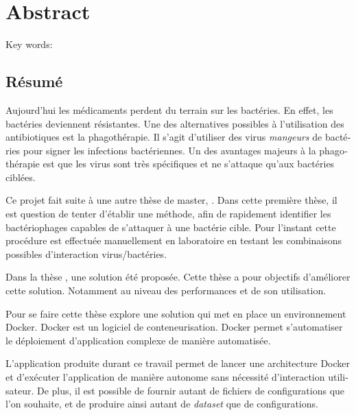 

\cleardoublepage
\chapter*{Abstract}
\lipsum[1-2]
\vskip0.5cm
Key words: 


\begin{otherlanguage}{french}
\cleardoublepage
\chapter*{Résumé}

Aujourd'hui les médicaments perdent du terrain sur les bactéries. En effet, les bactéries deviennent résistantes. Une des alternatives possibles à l'utilisation des antibiotiques est la phagothérapie. Il s'agit d'utiliser des virus \emph{mangeurs} de bactéries pour signer les infections bactériennes. Un des avantages majeurs à la phagothérapie est que les virus sont très spécifiques et ne s'attaque qu'aux bactéries ciblées. 

Ce projet fait suite à une autre thèse de master, \thLeite . Dans cette première thèse, il est question de tenter d'établir une méthode, afin de rapidement identifier les bactériophages capables de s'attaquer à une bactérie cible. Pour l'instant cette procédure est effectuée manuellement en laboratoire en testant les combinaisons possibles d'interaction virus/bactéries.

Dans la thèse \thLeite , une solution été proposée. Cette thèse a pour objectifs d'améliorer cette solution. Notamment au niveau des performances et de son utilisation.

Pour se faire cette thèse explore une solution qui met en place un environnement Docker. Docker est un logiciel de conteneurisation. Docker permet s'automatiser le déploiement d'application complexe de manière automatisée.

L'application produite durant ce travail permet de lancer une architecture Docker et d'exécuter l'application de manière autonome sans nécessité d'interaction utilisateur. De plus, il est possible de fournir autant de fichiers de configurations que l'on souhaite, et de produire ainsi autant de \emph{dataset} que de configurations.

\end{otherlanguage}


